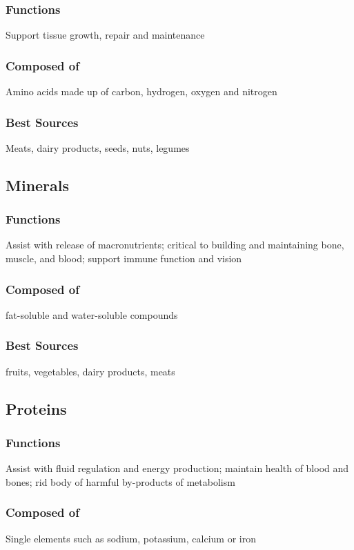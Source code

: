 \documentclass[title={Chapter 1}]{fdsn201notes}
\begin{document}
\subsubsection{Functions} Support tissue growth, repair and maintenance

\subsubsection{Composed of} Amino acids made up of carbon, hydrogen, oxygen and nitrogen

\subsubsection{Best Sources} Meats, dairy products, seeds, nuts, legumes

\textcolor{nutrientred}{\subsection{Minerals}\label{subsec:minerals}}
\subsubsection{Functions} Assist with release of macronutrients; critical to building and maintaining bone, muscle, and blood; support immune function and vision

\subsubsection{Composed of} fat-soluble and water-soluble compounds

\subsubsection{Best Sources} fruits, vegetables, dairy products, meats

\textcolor{nutrientpurple}{\subsection{Proteins}\label{subsec:proteins}}
\subsubsection{Functions} Assist with fluid regulation and energy production; maintain health of blood and bones; rid body of harmful by-products of metabolism

\subsubsection{Composed of} Single elements such as sodium, potassium, calcium or iron
\end{document}
